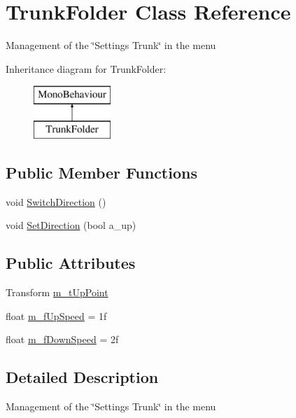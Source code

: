 \hypertarget{class_trunk_folder}{}\section{Trunk\+Folder Class Reference}
\label{class_trunk_folder}


Management of the \char`\"{}\+Settings Trunk\char`\"{} in the menu  


Inheritance diagram for Trunk\+Folder\+:\begin{figure}[H]
\begin{center}
\leavevmode
\includegraphics[height=2.000000cm]{class_trunk_folder}
\end{center}
\end{figure}
\subsection*{Public Member Functions}
\begin{DoxyCompactItemize}
\item 
void \mbox{\hyperlink{class_trunk_folder_a877c0ee58132e7ec27436e691595cab4}{Switch\+Direction}} ()
\item 
void \mbox{\hyperlink{class_trunk_folder_ac8c7e6097fe621bc041834bea9c17940}{Set\+Direction}} (bool a\+\_\+up)
\end{DoxyCompactItemize}
\subsection*{Public Attributes}
\begin{DoxyCompactItemize}
\item 
Transform \mbox{\hyperlink{class_trunk_folder_adad3381047ee490b2b5c36548a00380e}{m\+\_\+t\+Up\+Point}}
\item 
float \mbox{\hyperlink{class_trunk_folder_adb52bbeab0b159bd7f5eda7c7d2b55d9}{m\+\_\+f\+Up\+Speed}} = 1f
\item 
float \mbox{\hyperlink{class_trunk_folder_aefe7232b2fbad90b1aefe33eeac6893b}{m\+\_\+f\+Down\+Speed}} = 2f
\end{DoxyCompactItemize}


\subsection{Detailed Description}
Management of the \char`\"{}\+Settings Trunk\char`\"{} in the menu 



